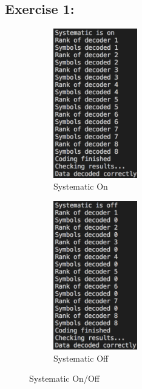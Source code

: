 \subsection{Exercise 1:}
\begin{figure}[H]
    \centering
    \begin{subfigure}{.49\textwidth}
        \centering
        \includegraphics[width=0.4\textwidth]{figures/KodoPython/systematic_on.png}
        \caption{Systematic On}
        \label{fig:systematic_on}
    \end{subfigure}
    \begin{subfigure}{.5\textwidth}
        \centering
        \includegraphics[width=0.4\textwidth]{figures/KodoPython/systematic_off.png}
        \caption{Systematic Off}
        \label{fig:systematic_off}
    \end{subfigure}
    \caption{Systematic On/Off}
    \label{fig:systematic_on_off}
\end{figure}
